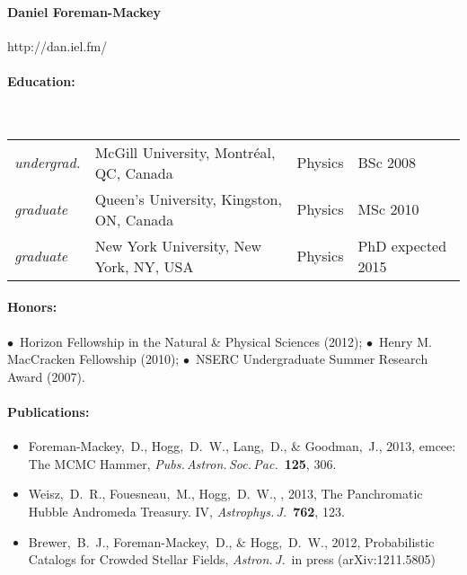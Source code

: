 \documentclass[letterpaper,12pt]{article}
\begin{document}
\paragraph{Daniel Foreman-Mackey} http://dan.iel.fm/

\paragraph{Education:}~\\[3pt]
\begin{tabular}{llll}
\textsl{undergrad.}
  & McGill University, Montr\'eal, QC, Canada & Physics & BSc 2008\\
\textsl{graduate}
  & Queen's University, Kingston, ON, Canada & Physics & MSc 2010\\
\textsl{graduate}
  & New York University, New York, NY, USA & Physics & PhD expected 2015
\end{tabular}

\paragraph{Honors:}
$\bullet$~Horizon Fellowship in the Natural \& Physical Sciences (2012);
$\bullet$~Henry M. MacCracken Fellowship (2010);
$\bullet$~NSERC Undergraduate Summer Research Award (2007).

\paragraph{Publications:}
\begin{itemize}\setlength{\itemsep}{0pt}
\item
Foreman-Mackey,~D., Hogg,~D.~W., Lang,~D., \& Goodman,~J., 2013,
emcee: The MCMC Hammer, \textit{Pubs.\,Astron.\,Soc.\,Pac.}\ \textbf{125}, 306.
\item
Weisz,~D.~R., Fouesneau,~M., Hogg,~D.~W., \etal, 2013,
The Panchromatic Hubble Andromeda Treasury. IV,
\textit{Astrophys.\,J.}\ \textbf{762}, 123.
\item
Brewer,~B.~J., Foreman-Mackey,~D., \& Hogg,~D.~W., 2012,
Probabilistic Catalogs for Crowded Stellar Fields,
\textit{Astron.\,J.}\ in press (arXiv:1211.5805)
\end{itemize}
\end{document}
